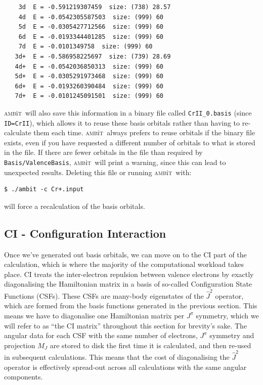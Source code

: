 \documentclass{report}
\newcommand{\ambit}{\textsc{amb}{\footnotesize i}\textsc{t}}
\begin{document}
\begin{verbatim}
    3d  E = -0.591219307459  size: (738) 28.57                                 
    4d  E = -0.0542305587503  size: (999) 60                                   
    5d  E = -0.0305427712566  size: (999) 60                                   
    6d  E = -0.0193344401285  size: (999) 60                                   
    7d  E = -0.0101349758  size: (999) 60                                      
   3d+  E = -0.586958225697  size: (739) 28.69                                 
   4d+  E = -0.0542036850313  size: (999) 60                                   
   5d+  E = -0.0305291973468  size: (999) 60                                   
   6d+  E = -0.0193260390484  size: (999) 60                                   
   7d+  E = -0.0101245091501  size: (999) 60
\end{verbatim}

\ambit\  will also save this information in a binary file called \texttt{CrII\_0.basis} (since
\texttt{ID=CrII}), which allows it to reuse these basis orbitals rather than having to re-calculate them
each time. \ambit\  always prefers to reuse orbitals if the binary file exists, even if you have
requested a different number of orbitals to what is stored in the file. If there are fewer orbitals in
the file than required by \texttt{Basis/ValenceBasis}, \ambit\  will print a warning, since this can lead
to unexpected results. Deleting this file or running \ambit\  with:

\begin{verbatim}
$ ./ambit -c Cr+.input
\end{verbatim}

will force a recalculation of the basis orbitals.

\subsection{CI - Configuration Interaction}

Once we've generated out basis orbitals, we can move on to the CI part of the calculation, which is
where the majority of the computational workload takes place. CI treats the inter-electron repulsion
between valence electrons by exactly diagonalising the Hamiltonian matrix in a basis of so-called
Configuration State Functions (CSFs). These CSFs are many-body eigenstates of the $\hat{J}^2$
operator, which are formed from the basis functions generated in the previous section. This means we
have to diagonalise one Hamiltonian matrix per $J^{\pi}$ symmetry, which we will refer to as ``the CI 
matrix'' throughout this section for brevity's sake.  The angular data for each CSF with the same number
of electrons, $J^{\pi}$ symmetry and projection $M_J$ are stored to disk the first time it is
calculated, and then re-used in subsequent calculations. This means that the cost of diagonalising the
$\hat{J}^2$ operator is effectively spread-out across all calculations with the same angular components.
\end{document}
